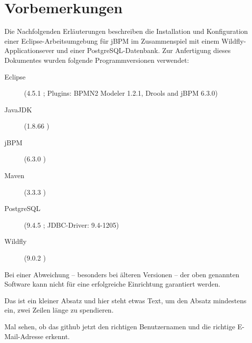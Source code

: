 \section{Vorbemerkungen}
Die Nachfolgenden Erläuterungen beschreiben die Installation und Konfiguration einer Eclipse-Arbeitsumgebung für jBPM im Zusammenspiel mit einem Wildfly-Applicationsever und einer PostgreSQL-Datenbank. Zur Anfertigung dieses Dokumentes wurden folgende Programmversionen verwendet:
\begin{description}
	\item[Eclipse] (4.5.1 ; Plugins: BPMN2 Modeler 1.2.1, Drools and jBPM 6.3.0)
	\item[JavaJDK] (1.8.66 ) 
	\item[jBPM] (6.3.0 )
	\item[Maven] (3.3.3 )
	\item[PostgreSQL] (9.4.5 ; JDBC-Driver: 9.4-1205)
	\item[Wildfly] (9.0.2 )
\end{description}
Bei einer Abweichung -- besonders bei älteren Versionen -- der oben genannten Software kann nicht für eine erfolgreiche Einrichtung garantiert werden.

Das ist ein kleiner Absatz und hier steht etwas Text, um den Absatz mindestens ein, zwei Zeilen länge zu spendieren.

Mal sehen, ob das github jetzt den richtigen Benutzernamen und die richtige E-Mail-Adresse erkennt.
